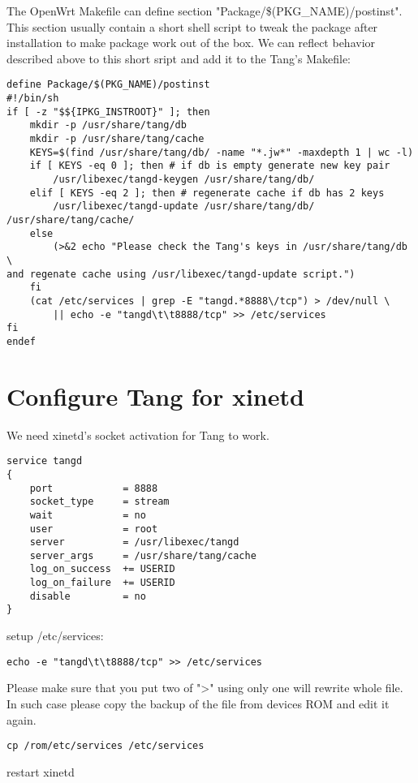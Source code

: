 The OpenWrt Makefile can define section "Package/\$(PKG\_NAME)/postinst".
This section usually contain a short shell script to tweak the package after installation to make package work out of the box.
We can reflect behavior described above to this short sript and add it to the Tang's Makefile:
\begin{lstlisting}[columns=fixed,basicstyle=\ttfamily\footnotesize,tabsize=4,backgroundcolor=\color{yellow!10}]
define Package/$(PKG_NAME)/postinst
#!/bin/sh
if [ -z "$${IPKG_INSTROOT}" ]; then
	mkdir -p /usr/share/tang/db
	mkdir -p /usr/share/tang/cache
	KEYS=$(find /usr/share/tang/db/ -name "*.jw*" -maxdepth 1 | wc -l)
	if [ KEYS -eq 0 ]; then # if db is empty generate new key pair
		/usr/libexec/tangd-keygen /usr/share/tang/db/
	elif [ KEYS -eq 2 ]; then # regenerate cache if db has 2 keys
		/usr/libexec/tangd-update /usr/share/tang/db/ /usr/share/tang/cache/
	else
		(>&2 echo "Please check the Tang's keys in /usr/share/tang/db \
and regenate cache using /usr/libexec/tangd-update script.")
	fi
	(cat /etc/services | grep -E "tangd.*8888\/tcp") > /dev/null \
		|| echo -e "tangd\t\t8888/tcp" >> /etc/services
fi
endef
\end{lstlisting}



\section{Configure Tang for xinetd}

We need xinetd's socket activation for Tang to work.    

\begin{lstlisting}[columns=fixed,basicstyle=\ttfamily\footnotesize,tabsize=4,backgroundcolor=\color{yellow!10},caption=Configuration of Tang service for xinetd]
service tangd
{
    port            = 8888
    socket_type     = stream
    wait            = no
    user            = root
    server          = /usr/libexec/tangd
    server_args     = /usr/share/tang/cache
    log_on_success  += USERID
    log_on_failure  += USERID
    disable         = no
}
\end{lstlisting}
setup /etc/services:
\begin{lstlisting}[columns=fixed,basicstyle=\ttfamily\footnotesize,tabsize=4,backgroundcolor=\color{yellow!10}]
echo -e "tangd\t\t8888/tcp" >> /etc/services
\end{lstlisting}
Please make sure that you put two of ">" using only one will rewrite whole file.
In such case please copy the backup of the file from devices ROM and edit it again.
\begin{lstlisting}[columns=fixed,basicstyle=\ttfamily\footnotesize,tabsize=4,backgroundcolor=\color{yellow!10}]
cp /rom/etc/services /etc/services
\end{lstlisting}
restart xinetd

